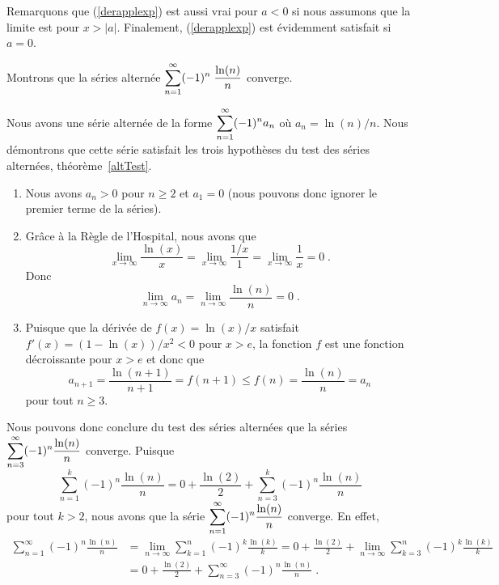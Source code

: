 {\begin{egg}[\eng]
Remarquons que (\ref{derapplexp}) est aussi vrai pour $a<0$ si nous
assumons que la limite est pour $x>|a|$. Finalement,
(\ref{derapplexp}) est évidemment satisfait si $a=0$.
\end{egg}

\begin{egg}[\eng]
Montrons que la séries alternée
$\displaystyle \sum_{n=1}^\infty (-1)^n\;\frac{\ln(n)}{n}$ converge.

Nous avons une série alternée de la forme
$\displaystyle \sum_{n=1}^\infty (-1)^n a_n$ où $a_n = \ln(n)/n$.  Nous
démontrons que cette série satisfait les trois hypothèses du test des
séries alternées, théorème~\ref{altTest}.
\begin{enumerate}
\item Nous avons $a_n>0$ pour $n\geq 2$ et $a_1 = 0$ (nous pouvons donc ignorer
le premier terme de la séries).
\item Grâce à la Règle de l'Hospital, nous avons que
\[
\lim_{x\rightarrow \infty} \frac{\ln(x)}{x}
= \lim_{x\rightarrow \infty} \frac{1/x}{1}
= \lim_{x\rightarrow \infty} \frac{1}{x} = 0 \; .
\]
Donc
\[
\lim_{n\rightarrow \infty} a_n = \lim_{n\rightarrow \infty} \frac{\ln(n)}{n}
= 0 \; .
\]
\item Puisque que la dérivée de $f(x) = \ln(x)/x$ satisfait
$f'(x) = (1-\ln(x))/x^2 < 0$ pour $x>e$, la fonction $f$ est une fonction
décroissante pour $x>e$ et donc que
\[
a_{n+1} = \frac{\ln(n+1)}{n+1} = f(n+1) \leq f(n) = \frac{\ln(n)}{n} =
a_n
\]
pour tout $n\geq 3$.
\end{enumerate}
Nous pouvons donc conclure du test des séries alternées que la séries
$\displaystyle \sum_{n=3}^\infty (-1)^n \frac{\ln(n)}{n}$ converge.
Puisque
\[
\sum_{n=1}^k (-1)^n \frac{\ln(n)}{n}
= 0 + \frac{\ln(2)}{2} + \sum_{n=3}^k (-1)^n \frac{\ln(n)}{n}
\]
pour tout $k>2$, nous avons que la série
$\displaystyle \sum_{n=1}^\infty (-1)^n \frac{\ln(n)}{n}$ converge.  En effet,
\begin{align*}
\sum_{n=1}^\infty (-1)^n \frac{\ln(n)}{n}
&= \lim_{n\rightarrow \infty} \sum_{k=1}^n (-1)^k \frac{\ln(k)}{k}
= 0 + \frac{\ln(2)}{2}
+ \lim_{n\rightarrow \infty} \sum_{k=3}^n (-1)^k \frac{\ln(k)}{k} \\
&= 0 + \frac{\ln(2)}{2}
+ \sum_{n=3}^\infty (-1)^n \frac{\ln(n)}{n} \; .
\end{align*}
\label{deriveAlt}
\end{egg}


}
